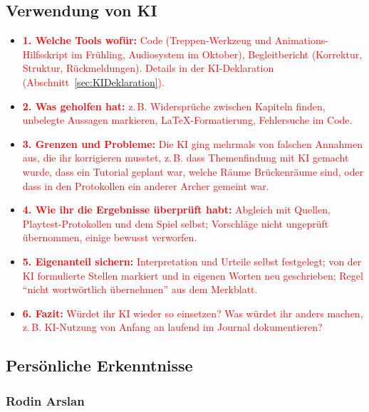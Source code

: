 \documentclass[../Main.tex]{subfiles}
\begin{document}
\subsection{Verwendung von KI} \label{sec:ReflexionKI}

\begin{itemize}[leftmargin=1.5cm]
    \item \textcolor{red}{\textbf{1. Welche Tools wofür:} Code (Treppen-Werkzeug und Animations-Hilfsskript im Frühling, Audiosystem im Oktober), Begleitbericht (Korrektur, Struktur, Rückmeldungen). Details in der KI-Deklaration (Abschnitt~\ref{sec:KIDeklaration}).}
    \item \textcolor{red}{\textbf{2. Was geholfen hat:} z.\,B. Widersprüche zwischen Kapiteln finden, unbelegte Aussagen markieren, \LaTeX-Formatierung, Fehlersuche im Code.}
    \item \textcolor{red}{\textbf{3. Grenzen und Probleme:} Die KI ging mehrmals von falschen Annahmen aus, die ihr korrigieren musstet, z.\,B. dass Themenfindung mit KI gemacht wurde, dass ein Tutorial geplant war, welche Räume Brückenräume sind, oder dass in den Protokollen ein anderer Archer gemeint war.}
    \item \textcolor{red}{\textbf{4. Wie ihr die Ergebnisse überprüft habt:} Abgleich mit Quellen, Playtest-Protokollen und dem Spiel selbst; Vorschläge nicht ungeprüft übernommen, einige bewusst verworfen.}
    \item \textcolor{red}{\textbf{5. Eigenanteil sichern:} Interpretation und Urteile selbst festgelegt; von der KI formulierte Stellen markiert und in eigenen Worten neu geschrieben; Regel \enquote{nicht wortwörtlich übernehmen} aus dem Merkblatt.}
    \item \textcolor{red}{\textbf{6. Fazit:} Würdet ihr KI wieder so einsetzen? Was würdet ihr anders machen, z.\,B. KI-Nutzung von Anfang an laufend im Journal dokumentieren?}
\end{itemize}

\subsection{Persönliche Erkenntnisse}

\subsubsection{Rodin Arslan}
\end{document}
